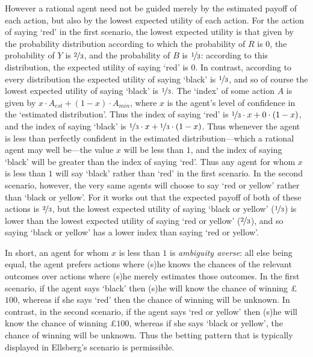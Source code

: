 However a rational agent need not be guided merely by the estimated payoff of each action, but also by the lowest expected utility of each action. For the action of saying `red' in the first scenario, the lowest expected utility is that given by the probability distribution according to which the probability of $R$ is $0$, the probability of $Y$ is $\nicefrac{2}{3}$, and the probability of $B$ is $\nicefrac{1}{3}$: according to this distribution, the expected utility of saying `red' is $0$. In contrast, according to every distribution the expected utility of saying `black' is $\nicefrac{1}{3}$, and so of course the lowest expected utility of saying `black' is $\nicefrac{1}{3}$. The `index' of some action $A$ is given by $x \cdot A_{est} + (1-x) \cdot A_{min}$, where $x$ is the agent's level of confidence in the `estimated distribution'. Thus the index of saying `red' is $\nicefrac{1}{3} \cdot x + 0 \cdot (1-x)$, and the index of saying `black' is $\nicefrac{1}{3} \cdot x + \nicefrac{1}{3} \cdot (1-x)$. Thus whenever the agent is less than perfectly confident in the estimated distribution---which a rational agent may well be---the value $x$ will be less than $1$, and the index of saying `black' will be greater than the index of saying `red'. Thus any agent for whom $x$ is less than $1$ will say `black' rather than `red' in the first scenario. In the second scenario, however, the very same agents will choose to say `red or yellow' rather than `black or yellow'. For it works out that the expected payoff of both of these actions is $\nicefrac{2}{3}$, but the lowest expected utility of saying `black or yellow' ($\nicefrac{1}{3}$) is lower than the lowest expected utility of saying `red or yellow' ($\nicefrac{2}{3}$), and so saying `black or yellow' has a lower index than saying `red or yellow'.

In short, an agent for whom $x$ is less than $1$ is \textit{ambiguity averse}: all else being equal, the agent prefers actions where (s)he knows the chances of the relevant outcomes over actions where (s)he merely estimates those outcomes. In the first scenario, if the agent says `black' then (s)he will know the chance of winning £$100$, whereas if she says `red' then the chance of winning will be unknown. In contrast, in the second scenario, if the agent says `red or yellow' then (s)he will know the chance of winning £$100$, whereas if she says `black or yellow', the chance of winning will be unknown. Thus the betting pattern that is typically displayed in Ellsberg's scenario is permissible. 

